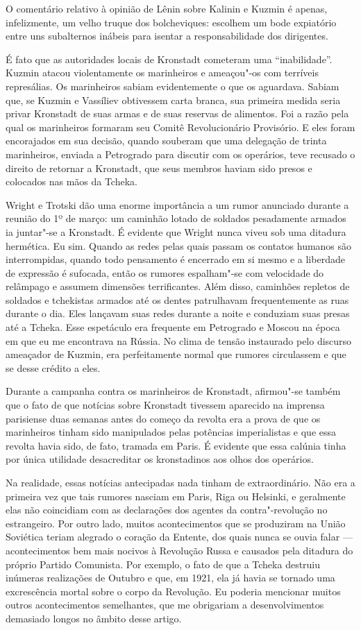 O comentário relativo à opinião de Lênin sobre Kalinin e Kuzmin é
apenas, infelizmente, um velho truque dos bolcheviques: escolhem um
bode expiatório entre uns subalternos inábeis para isentar a
responsabilidade dos dirigentes.

É fato que as autoridades locais de Kronstadt cometeram uma
“inabilidade”. Kuzmin atacou violentamente os marinheiros e
ameaçou"-os com terríveis represálias. Os marinheiros sabiam
evidentemente o que os aguardava. Sabiam que, se Kuzmin e Vassíliev
obtivessem carta branca, sua primeira medida seria privar Kronstadt de
suas armas e de suas reservas de alimentos. Foi a razão pela qual os
marinheiros formaram seu Comitê Revolucionário Provisório. E eles foram
encorajados em sua decisão, quando souberam que uma delegação de trinta
marinheiros, enviada a Petrogrado para discutir com os operários,
teve recusado o direito de retornar a Kronstadt, que seus membros haviam
sido presos e colocados nas mãos da Tcheka.

Wright e Trotski dão uma enorme importância a um rumor anunciado durante
a reunião do 1º de março: um caminhão lotado de soldados pesadamente
armados ia juntar"-se a Kronstadt. É evidente que Wright nunca viveu
sob uma ditadura hermética. Eu sim. Quando as redes pelas quais passam
os contatos humanos são interrompidas, quando todo pensamento é
encerrado em si mesmo e a liberdade de expressão é sufocada, então
os rumores espalham"-se com velocidade do relâmpago e assumem
dimensões terrificantes. Além disso, caminhões repletos de soldados e
tchekistas armados até os dentes patrulhavam frequentemente as ruas
durante o dia. Eles lançavam suas redes durante a noite e conduziam
suas presas até a Tcheka. Esse espetáculo era frequente em Petrogrado e
Moscou na época em que eu me encontrava na Rússia. No clima de tensão
instaurado pelo discurso ameaçador de Kuzmin, era perfeitamente normal
que rumores circulassem e que se desse crédito a eles.

Durante a campanha contra os marinheiros de Kronstadt, afirmou"-se
também que o fato de que notícias sobre Kronstadt tivessem
aparecido na imprensa parisiense duas semanas antes do começo da
revolta era a prova de que os marinheiros tinham sido manipulados pelas
potências imperialistas e que essa revolta havia sido, de fato, tramada
em Paris. É evidente que essa calúnia tinha por única utilidade
desacreditar os kronstadinos aos olhos dos operários.

Na realidade, essas notícias antecipadas nada tinham de extraordinário.
Não era a primeira vez que tais rumores nasciam em Paris, Riga ou
Helsinki, e geralmente elas não coincidiam com as declarações dos
agentes da contra"-revolução no estrangeiro. Por outro lado, muitos
acontecimentos que se produziram na União Soviética teriam
alegrado o coração da Entente, dos quais nunca se ouvia falar ---
acontecimentos bem mais nocivos à Revolução Russa e causados pela
ditadura do próprio Partido Comunista. Por exemplo, o fato de que a
Tcheka destruiu inúmeras realizações de Outubro e que, em 1921, ela já
havia se tornado uma excrescência mortal sobre o corpo da Revolução. Eu
poderia mencionar muitos outros acontecimentos semelhantes, que me
obrigariam a desenvolvimentos demasiado longos no âmbito desse artigo.


